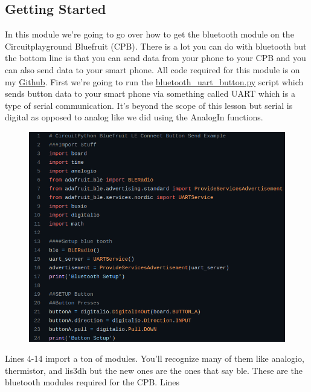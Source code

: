 \subsection{Getting Started}

In this module we're going to go over how to get the bluetooth module
on the Circuitplayground Bluefruit (CPB). There is a lot you can do
with bluetooth but the bottom line is that you can send data from your
phone to your CPB and you can also send data to your smart phone. All
code required for this module is on
my \href{https://github.com/cmontalvo251/Microcontrollers/tree/master/Circuit_Playground/CircuitPython/CPB_DataLogger}{Github}. First we're going to run
the \href{https://github.com/cmontalvo251/Microcontrollers/blob/master/Circuit_Playground/CircuitPython/CPB_DataLogger/bluefruit_uart_button.py}{bluetooth\_uart\_button.py}
script which sends button data to your smart phone via something called UART
which is a type of serial communication. It's beyond the scope of this
lesson but serial is digital as opposed to analog like we did using the AnalogIn functions. 
\begin{figure}[H]
  \begin{center}
    \includegraphics[width=\textwidth]{Figures/bluetooth_code.png}
  \end{center}
\end{figure}
Lines 4-14 import a ton of modules. You'll recognize many of them like
analogio, thermistor, and lis3dh but the new ones are the ones that
say ble. These are the bluetooth modules required for the CPB. Lines

